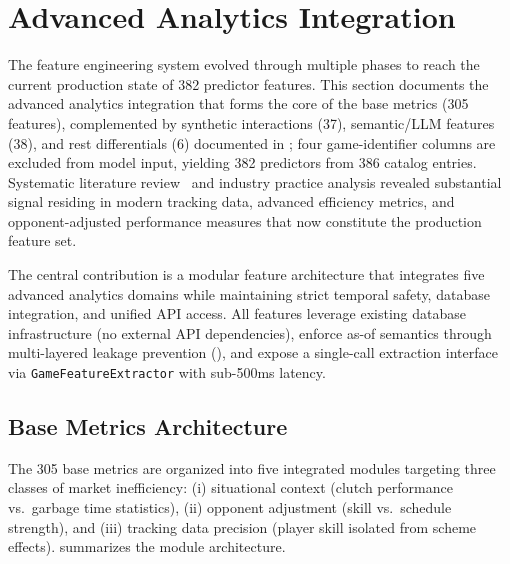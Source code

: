 
\section{Advanced Analytics Integration}
\label{sec:phase2-advanced-stats}

The feature engineering system evolved through multiple phases to reach the current production state of 382 predictor features. This section documents the advanced analytics integration that forms the core of the base metrics (305 features), complemented by synthetic interactions (37), semantic/LLM features (38), and rest differentials (6) documented in ; four game-identifier columns are excluded from model input, yielding 382 predictors from 386 catalog entries. Systematic literature review~\cite{lopez2020big, yurko2020going, deshpande2016estimating} and industry practice analysis revealed substantial signal residing in modern tracking data, advanced efficiency metrics, and opponent-adjusted performance measures that now constitute the production feature set.

The central contribution is a modular feature architecture that integrates five advanced analytics domains while maintaining strict temporal safety, database integration, and unified API access. All features leverage existing database infrastructure (no external API dependencies), enforce as-of semantics through multi-layered leakage prevention (), and expose a single-call extraction interface via \texttt{GameFeatureExtractor} with sub-500ms latency.

\subsection{Base Metrics Architecture}
\label{subsec:phase2-overview}

The 305 base metrics are organized into five integrated modules targeting three classes of market inefficiency: (i) situational context (clutch performance vs.\ garbage time statistics), (ii) opponent adjustment (skill vs.\ schedule strength), and (iii) tracking data precision (player skill isolated from scheme effects).  summarizes the module architecture.

